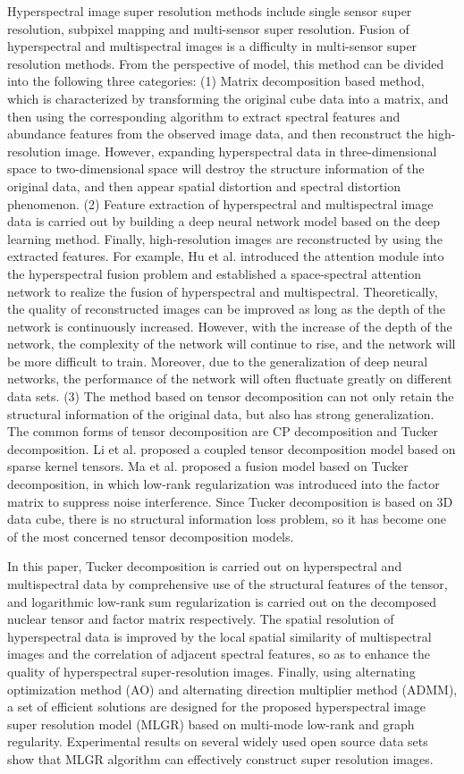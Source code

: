 \documentclass[journal]{IEEEtran}%
\begin{document}
Hyperspectral image super resolution methods include single sensor super resolution, subpixel mapping and multi{-}sensor super resolution. Fusion of hyperspectral and multispectral images is a difficulty in multi{-}sensor super resolution methods. From the perspective of model, this method can be divided into the following three categories: (1) Matrix decomposition based method, which is characterized by transforming the original cube data into a matrix, and then using the corresponding algorithm to extract spectral features and abundance features from the observed image data, and then reconstruct the high{-}resolution image. However, expanding hyperspectral data in three{-}dimensional space to two{-}dimensional space will destroy the structure information of the original data, and then appear spatial distortion and spectral distortion phenomenon. (2) Feature extraction of hyperspectral and multispectral image data is carried out by building a deep neural network model based on the deep learning method. Finally, high{-}resolution images are reconstructed by using the extracted features. For example, Hu et al. introduced the attention module into the hyperspectral fusion problem and established a space{-}spectral attention network to realize the fusion of hyperspectral and multispectral. Theoretically, the quality of reconstructed images can be improved as long as the depth of the network is continuously increased. However, with the increase of the depth of the network, the complexity of the network will continue to rise, and the network will be more difficult to train. Moreover, due to the generalization of deep neural networks, the performance of the network will often fluctuate greatly on different data sets. (3) The method based on tensor decomposition can not only retain the structural information of the original data, but also has strong generalization. The common forms of tensor decomposition are CP decomposition and Tucker decomposition. Li et al. proposed a coupled tensor decomposition model based on sparse kernel tensors. Ma et al. proposed a fusion model based on Tucker decomposition, in which low{-}rank regularization was introduced into the factor matrix to suppress noise interference. Since Tucker decomposition is based on 3D data cube, there is no structural information loss problem, so it has become one of the most concerned tensor decomposition models.%
\par%
In this paper, Tucker decomposition is carried out on hyperspectral and multispectral data by comprehensive use of the structural features of the tensor, and logarithmic low{-}rank sum regularization is carried out on the decomposed nuclear tensor and factor matrix respectively. The spatial resolution of hyperspectral data is improved by the local spatial similarity of multispectral images and the correlation of adjacent spectral features, so as to enhance the quality of hyperspectral super{-}resolution images. Finally, using alternating optimization method (AO) and alternating direction multiplier method (ADMM), a set of efficient solutions are designed for the proposed hyperspectral image super resolution model (MLGR) based on multi{-}mode low{-}rank and graph regularity. Experimental results on several widely used open source data sets show that MLGR algorithm can effectively construct super resolution images.%
\par

%
\end{document}

